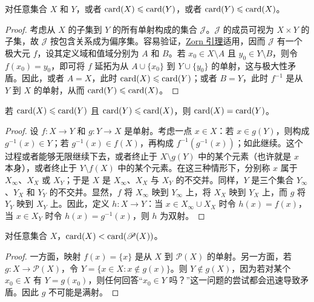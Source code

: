 \documentclass[../../main.tex]{subfiles}%
\begin{document}
\begin{proposition}\label{proposition:ch00-cardinality-comparability}
对任意集合 $X$ 和 $Y$，或者 $\operatorname{card}(X)\leqslant\operatorname{card}(Y)$，或者 $\operatorname{card}(Y)\leqslant\operatorname{card}(X)$。
\end{proposition}
\begin{proof}
考虑从 $X$ 的子集到 $Y$ 的所有单射构成的集合 $\mathscr{J}$。$\mathscr{J}$ 的成员可视为 $X\times Y$ 的子集，故 $\mathscr{J}$ 按包含关系成为偏序集。容易验证，\hyperref[lemma:ch00-zorn]{Zorn 引理}适用，因而 $\mathscr{J}$ 有一个极大元 $f$，设其定义域和值域分别为 $A$ 和 $B$。若 $x_0\in X\setminus A$ 且 $y_0\in Y\setminus B$，则令 $f(x_0)=y_0$，即可将 $f$ 延拓为从 $A\cup\{x_0\}$ 到 $Y\cup\{y_0\}$ 的单射，这与极大性矛盾。因此，或者 $A=X$，此时 $\operatorname{card}(X)\leqslant\operatorname{card}(Y)$；或者 $B=Y$，此时 $f^{-1}$ 是从 $Y$ 到 $X$ 的单射，从而 $\operatorname{card}(Y)\leqslant\operatorname{card}(X)$。
\end{proof}

\begin{theorem}\label{theorem:ch00-schroeder-bernstein}
若 $\operatorname{card}(X)\leqslant\operatorname{card}(Y)$ 且 $\operatorname{card}(Y)\leqslant\operatorname{card}(X)$，则 $\operatorname{card}(X)=\operatorname{card}(Y)$。
\end{theorem}
\begin{proof}
设 $f:X\to Y$ 和 $g:Y\to X$ 是单射。考虑一点 $x\in X$：若 $x\in g(Y)$，则构成 $g^{-1}(x)\in Y$；若 $g^{-1}(x)\in f(X)$，再构成 $f^{-1}(g^{-1}(x))$；如此继续。这个过程或者能够无限继续下去，或者终止于 $X\setminus g(Y)$ 中的某个元素（也许就是 $x$ 本身），或者终止于 $Y\setminus f(X)$ 中的某个元素。在这三种情形下，分别称 $x$ 属于 $X_\infty$、$X_X$ 或 $X_Y$；于是 $X$ 是 $X_\infty$、$X_X$ 与 $X_Y$ 的不交并。同样，$Y$ 是三个集合 $Y_\infty$、$Y_X$ 和 $Y_Y$ 的不交并。显然，$f$ 将 $X_\infty$ 映到 $Y_\infty$ 上，将 $X_X$ 映到 $Y_X$ 上，而 $g$ 将 $Y_Y$ 映到 $X_Y$ 上。因此，定义 $h:X\to Y$：当 $x\in X_\infty\cup X_X$ 时令 $h(x)=f(x)$，当 $x\in X_Y$ 时令 $h(x)=g^{-1}(x)$，则 $h$ 为双射。
\end{proof}

\begin{proposition}\label{proposition:ch00-power-set-larger}
对任意集合 $X$，$\operatorname{card}(X)<\operatorname{card}(\mathscr{P}(X))$。
\end{proposition}
\begin{proof}
一方面，映射 $f(x)=\{x\}$ 是从 $X$ 到 $\mathscr{P}(X)$ 的单射。另一方面，若 $g:X\to\mathscr{P}(X)$，令 $Y=\{x\in X:x\notin g(x)\}$。则 $Y\notin g(X)$，因为若对某个 $x_0\in X$ 有 $Y=g(x_0)$，则任何回答“$x_0\in Y$ 吗？”这一问题的尝试都会迅速导致矛盾。因此 $g$ 不可能是满射。
\end{proof}
\end{document}
